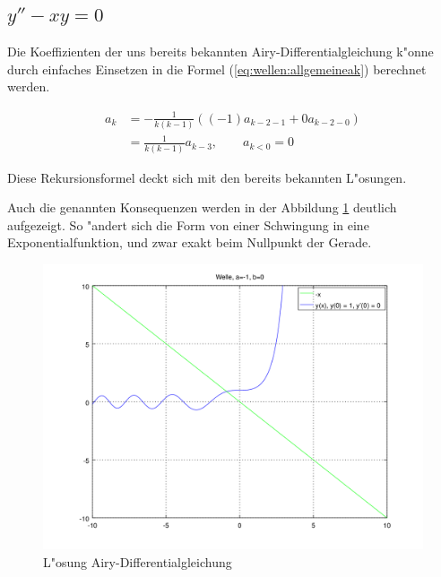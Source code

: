 \subsection{\texorpdfstring{$y''-xy = 0$}{y''-xy = 0}}
Die Koeffizienten der uns bereits bekannten Airy-Differentialgleichung k"onne 
durch einfaches Einsetzen in die Formel (\ref{eq:wellen:allgemeineak}) 
berechnet werden.

\begin{equation*}
	\begin{split}
		a_k &= -\frac{1}{k(k-1)} ((-1) a_{k-2-1} + 
		0 a_{k-2-0})
		\\
		&= \frac{1}{k(k-1)} a_{k-3}, \qquad a_{k < 0} = 0
	\end{split}
\end{equation*}

Diese Rekursionsformel deckt sich mit den bereits bekannten L"osungen.

Auch die genannten Konsequenzen werden in der Abbildung 
\ref{fig:wellen:airy-dgl} deutlich aufgezeigt. So "andert sich die Form von 
einer Schwingung in eine Exponentialfunktion, und zwar exakt beim Nullpunkt der 
Gerade.

\begin{figure}
	\includegraphics[scale=0.65]{./wellen/images/allgemein/n1.png}
	\caption{L"osung Airy-Differentialgleichung}
	\label{fig:wellen:airy-dgl}
\end{figure}